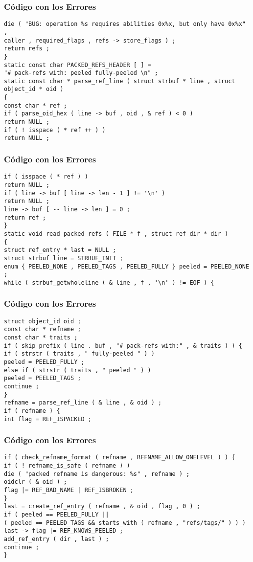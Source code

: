 \documentclass{beamer}
\begin{document}
\begin{frame}[fragile]
\frametitle{C\'odigo con los Errores}
\begin{verbatim}
die ( "BUG: operation %s requires abilities 0x%x, but only have 0x%x" , 
caller , required_flags , refs -> store_flags ) ; 
return refs ; 
} 
static const char PACKED_REFS_HEADER [ ] = 
"# pack-refs with: peeled fully-peeled \n" ; 
static const char * parse_ref_line ( struct strbuf * line , struct object_id * oid ) 
{ 
const char * ref ; 
if ( parse_oid_hex ( line -> buf , oid , & ref ) < 0 ) 
return NULL ; 
if ( ! isspace ( * ref ++ ) ) 
return NULL ; 
\end{verbatim}
\end{frame}
\begin{frame}[fragile]
\frametitle{C\'odigo con los Errores}
\begin{verbatim}
if ( isspace ( * ref ) ) 
return NULL ; 
if ( line -> buf [ line -> len - 1 ] != '\n' ) 
return NULL ; 
line -> buf [ -- line -> len ] = 0 ; 
return ref ; 
} 
static void read_packed_refs ( FILE * f , struct ref_dir * dir ) 
{ 
struct ref_entry * last = NULL ; 
struct strbuf line = STRBUF_INIT ; 
enum { PEELED_NONE , PEELED_TAGS , PEELED_FULLY } peeled = PEELED_NONE ; 
while ( strbuf_getwholeline ( & line , f , '\n' ) != EOF ) { 
\end{verbatim}
\end{frame}
\begin{frame}[fragile]
\frametitle{C\'odigo con los Errores}
\begin{verbatim}
struct object_id oid ; 
const char * refname ; 
const char * traits ; 
if ( skip_prefix ( line . buf , "# pack-refs with:" , & traits ) ) { 
if ( strstr ( traits , " fully-peeled " ) ) 
peeled = PEELED_FULLY ; 
else if ( strstr ( traits , " peeled " ) ) 
peeled = PEELED_TAGS ; 
continue ; 
} 
refname = parse_ref_line ( & line , & oid ) ; 
if ( refname ) { 
int flag = REF_ISPACKED ; 
\end{verbatim}
\end{frame}
\begin{frame}[fragile]
\frametitle{C\'odigo con los Errores}
\begin{verbatim}
if ( check_refname_format ( refname , REFNAME_ALLOW_ONELEVEL ) ) { 
if ( ! refname_is_safe ( refname ) ) 
die ( "packed refname is dangerous: %s" , refname ) ; 
oidclr ( & oid ) ; 
flag |= REF_BAD_NAME | REF_ISBROKEN ; 
} 
last = create_ref_entry ( refname , & oid , flag , 0 ) ; 
if ( peeled == PEELED_FULLY || 
( peeled == PEELED_TAGS && starts_with ( refname , "refs/tags/" ) ) ) 
last -> flag |= REF_KNOWS_PEELED ; 
add_ref_entry ( dir , last ) ; 
continue ; 
} 
\end{verbatim}
\end{frame}
\end{document}
